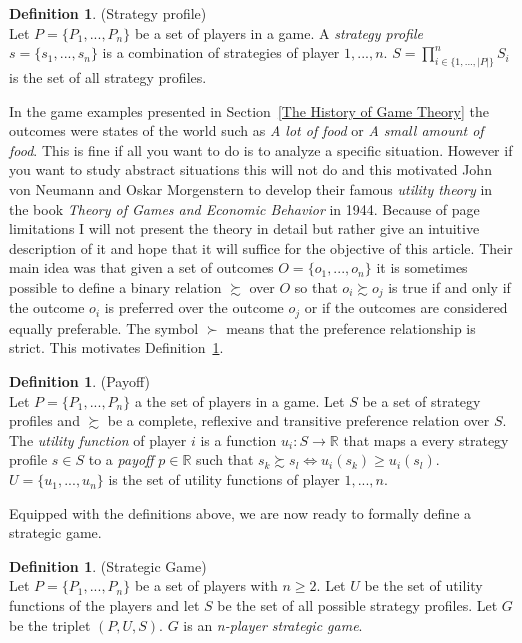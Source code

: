 \documentclass{article}
\theoremstyle{definition}
\newtheorem{definition}[theorem]{Definition}
\theoremstyle{remark}
\begin{document}
\begin{definition} (Strategy profile) \label{Strategy profile}\\
  Let $P = \{P_1,...,P_n\}$ be a set of players in a game. A
  \emph{strategy profile} $s = \{s_1,...,s_n\}$ is a combination of
  strategies of player $1,...,n$. $S = \prod_{i \in \{1,...,|P|\}}^n
  S_i $ is the set of all strategy profiles.
\end{definition}

In the game examples presented in Section~\ref{The History of Game
  Theory} the outcomes were states of the world such as \emph{A lot of
food} or \emph{A small amount of food}. This is fine if all you want
to do is to analyze a specific situation. However if you want to study
abstract situations this will not do and this motivated John von
Neumann and Oskar Morgenstern to develop their famous \emph{utility
  theory} in the book \emph{Theory of Games and Economic Behavior} in
1944. Because of page limitations I will not present the theory
in detail but rather give an intuitive description of it and hope that
it will suffice for the objective of this article. Their main idea was
that given a set of outcomes $O = \{o_1,...,o_n\}$ it is sometimes
possible to define a binary relation $\succsim$ over $O$ so that $o_i
\succsim o_j$ is true if and only if the outcome $o_i$ is preferred over the
outcome $o_j$ or if the outcomes are considered equally
preferable. The symbol $\succ$ means that the preference relationship
is strict. \citep{Maschler} This motivates Definition~\ref{Payoff}.

\begin{definition} (Payoff) \label{Payoff}\\
  Let $P = \{P_1,...,P_n\}$ a the set of players in a game. Let $S$ be
  a set of strategy profiles and $\succsim$ be a complete, reflexive
  and transitive preference relation over $S$. The
  \emph{utility function} of player $i$ is a function $u_i : S
  \rightarrow \mathbb{R}$ that maps a every strategy profile $s \in S$
  to a \emph{payoff} $p \in \mathbb{R}$ such that $s_k \succsim s_l
  \Leftrightarrow u_i(s_k) \geq u_i(s_l)$. $U = \{u_1,...,u_n\}$ is the
  set of utility functions of player $1,...,n$.
\end{definition}

Equipped with the definitions above, we are now ready to formally
define a strategic game.

\begin{definition} (Strategic Game) \label{Strategic Game}\\
  Let $P = \{P_1,...,P_n\}$ be a set of players with $n \geq 2$. Let
  $U$ be the set of utility functions of the players and let $S$
  be the set of all possible strategy profiles. Let $G$ be the triplet
  $(P,U,S)$. $G$ is an \emph{n-player strategic game}.  
\end{definition}
\end{document}
